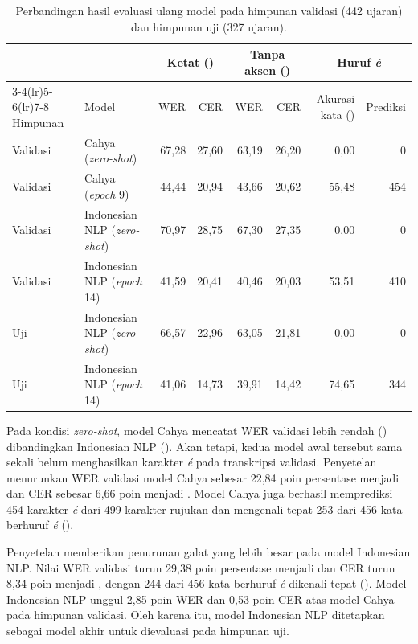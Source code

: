 \begin{table}[!htbp]
  \centering\small
  \caption{Perbandingan hasil evaluasi ulang model pada himpunan validasi (442 ujaran) dan himpunan uji (327 ujaran).}
  \label{tab:hasil-utama}
  \begin{tabular}{@{}llrrrrrr@{}}
    \toprule
    & & \multicolumn{2}{c}{Ketat (\pct{})} & \multicolumn{2}{c}{Tanpa aksen (\pct{})} & \multicolumn{2}{c}{Huruf \textit{é}} \\
    \cmidrule(lr){3-4}\cmidrule(lr){5-6}\cmidrule(lr){7-8}
    Himpunan & Model & WER & CER & WER & CER & Akurasi kata (\pct{}) & Prediksi \\
    \midrule
    Validasi & Cahya (\textit{zero-shot}) & 67,28 & 27,60 & 63,19 & 26,20 & 0,00 & 0 \\
    Validasi & Cahya (\textit{epoch} 9) & 44,44 & 20,94 & 43,66 & 20,62 & 55,48 & 454 \\
    Validasi & Indonesian NLP (\textit{zero-shot}) & 70,97 & 28,75 & 67,30 & 27,35 & 0,00 & 0 \\
    Validasi & Indonesian NLP (\textit{epoch} 14) & 41,59 & 20,41 & 40,46 & 20,03 & 53,51 & 410 \\
    \midrule
    Uji & Indonesian NLP (\textit{zero-shot}) & 66,57 & 22,96 & 63,05 & 21,81 & 0,00 & 0 \\
    Uji & Indonesian NLP (\textit{epoch} 14) & 41,06 & 14,73 & 39,91 & 14,42 & 74,65 & 344 \\
    \bottomrule
  \end{tabular}
\end{table}

Pada kondisi \textit{zero-shot}, model Cahya mencatat WER validasi lebih rendah () dibandingkan Indonesian NLP (). Akan tetapi, kedua model awal tersebut sama sekali belum menghasilkan karakter \textit{é} pada transkripsi validasi. Penyetelan menurunkan WER validasi model Cahya sebesar 22,84 poin persentase menjadi  dan CER sebesar 6,66 poin menjadi . Model Cahya juga berhasil memprediksi 454 karakter \textit{é} dari 499 karakter rujukan dan mengenali tepat 253 dari 456 kata berhuruf \textit{é} ().

Penyetelan memberikan penurunan galat yang lebih besar pada model Indonesian NLP. Nilai WER validasi turun 29,38 poin persentase menjadi  dan CER turun 8,34 poin menjadi , dengan 244 dari 456 kata berhuruf \textit{é} dikenali tepat (). Model Indonesian NLP unggul 2,85 poin WER dan 0,53 poin CER atas model Cahya pada himpunan validasi. Oleh karena itu, model Indonesian NLP ditetapkan sebagai model akhir untuk dievaluasi pada himpunan uji.

